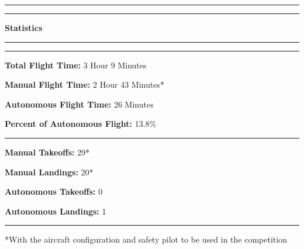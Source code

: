 \documentclass[]{auvsi_doc}
\begin{document}
\begin{center}
\hrule
\rule{\textwidth}{0.1pt}
\textbf{Statistics}
\rule{\textwidth}{0.1pt}
\hrule

\end{center}

\textbf{Total Flight Time:} 3 Hour 9 Minutes

\textbf{Manual Flight Time:} 2 Hour 43 Minutes*

\textbf{Autonomous Flight Time:} 26 Minutes

\textbf{Percent of Autonomous Flight:} 13.8\%

\hrule
\textbf{Manual Takeoffs:} 29*

\textbf{Manual Landings:} 20*

\textbf{Autonomous Takeoffs:} 0

\textbf{Autonomous Landings:} 1

\hrule
*With the aircraft configuration and safety pilot to be used in the competition
\end{document}
